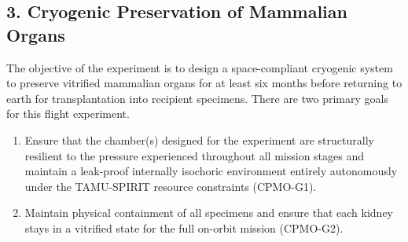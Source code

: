 \documentclass[conf]{new-aiaa}
\begin{document}
\clearpage
\subsection{3. Cryogenic Preservation of Mammalian Organs}

The objective of the experiment is to design a space-compliant cryogenic system to preserve vitrified mammalian organs for at least six months before returning to earth for transplantation into recipient specimens. There are two primary goals for this flight experiment.

\vspace{0.3em}
\begin{enumerate}[leftmargin=*]
    \item Ensure that the chamber(s) designed for the experiment are structurally resilient to the pressure experienced throughout all mission stages and maintain a leak-proof internally isochoric environment entirely autonomously under the TAMU-SPIRIT resource constraints (CPMO-G1).
    \item Maintain physical containment of all specimens and ensure that each kidney stays in a vitrified state for the full on-orbit mission (CPMO-G2).
\end{enumerate}
\end{document}
